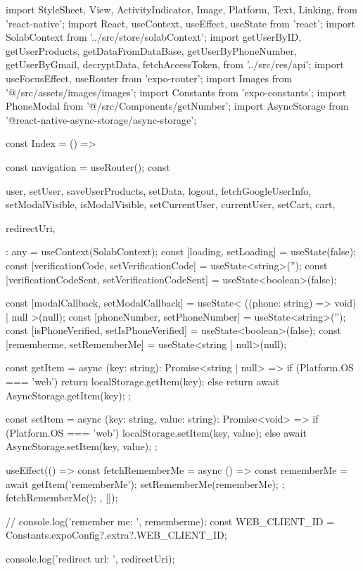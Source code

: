 import {
  StyleSheet,
  View,
  ActivityIndicator,
  Image,
  Platform,
  Text,
  Linking,
} from 'react-native';
import React, {useContext, useEffect, useState} from 'react';
import SolabContext from '../src/store/solabContext';
import {
  getUserByID,
  getUserProducts,
  getDataFromDataBase,
  getUserByPhoneNumber,
  getUserByGmail,
  decryptData,
  fetchAccessToken,
} from '../src/res/api';
import {useFocusEffect, useRouter} from 'expo-router';
import Images from '@/src/assets/images/images';
import Constants from 'expo-constants';
import PhoneModal from '@/src/Components/getNumber';
import AsyncStorage from '@react-native-async-storage/async-storage';

const Index = () => {
  const navigation = useRouter();
  const {
    user,
    setUser,
    saveUserProducts,
    setData,
    logout,
    fetchGoogleUserInfo,
    setModalVisible,
    isModalVisible,
    setCurrentUser,
    currentUser,
    setCart,
    cart,

    redirectUri,
  }: any = useContext(SolabContext);
  const [loading, setLoading] = useState(false);
  const [verificationCode, setVerificationCode] = useState<string>('');
  const [verificationCodeSent, setVerificationCodeSent] =
    useState<boolean>(false);

  const [modalCallback, setModalCallback] = useState<
    ((phone: string) => void) | null
  >(null);
  const [phoneNumber, setPhoneNumber] = useState<string>('');
  const [isPhoneVerified, setIsPhoneVerified] = useState<boolean>(false);
  const [rememberme, setRememberMe] = useState<string | null>(null);

  const getItem = async (key: string): Promise<string | null> => {
    if (Platform.OS === 'web') {
      return localStorage.getItem(key);
    } else {
      return await AsyncStorage.getItem(key);
    }
  };

  const setItem = async (key: string, value: string): Promise<void> => {
    if (Platform.OS === 'web') {
      localStorage.setItem(key, value);
    } else {
      await AsyncStorage.setItem(key, value);
    }
  };

  useEffect(() => {
    const fetchRememberMe = async () => {
      const rememberMe = await getItem('rememberMe');
      setRememberMe(rememberMe);
    };
    fetchRememberMe();
  }, []);

  // console.log('remember me: ', rememberme);
  const WEB_CLIENT_ID = Constants.expoConfig?.extra?.WEB_CLIENT_ID;

  console.log('redirect url: ', redirectUri);

}

